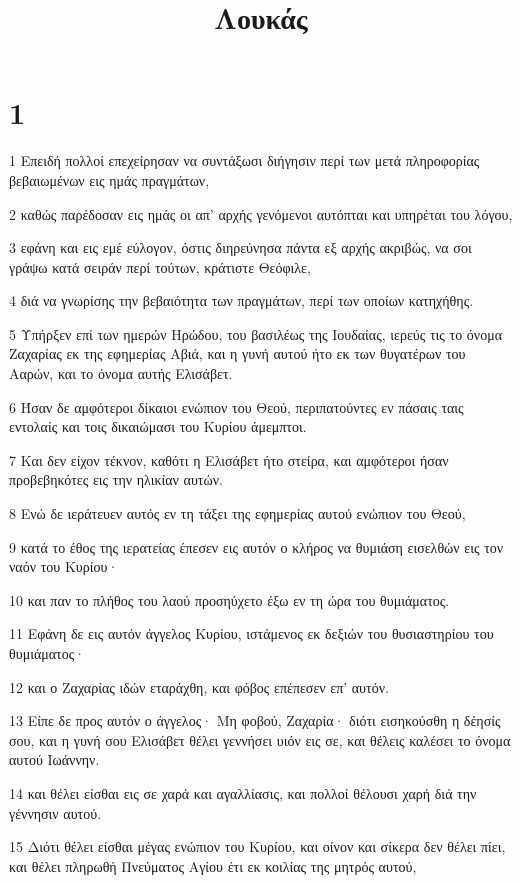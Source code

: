 

\title{Λουκάς}


\chapter{1}

\par 1 Επειδή πολλοί επεχείρησαν να συντάξωσι διήγησιν περί των μετά πληροφορίας βεβαιωμένων εις ημάς πραγμάτων,
\par 2 καθώς παρέδοσαν εις ημάς οι απ' αρχής γενόμενοι αυτόπται και υπηρέται του λόγου,
\par 3 εφάνη και εις εμέ εύλογον, όστις διηρεύνησα πάντα εξ αρχής ακριβώς, να σοι γράψω κατά σειράν περί τούτων, κράτιστε Θεόφιλε,
\par 4 διά να γνωρίσης την βεβαιότητα των πραγμάτων, περί των οποίων κατηχήθης.
\par 5 Υπήρξεν επί των ημερών Ηρώδου, του βασιλέως της Ιουδαίας, ιερεύς τις το όνομα Ζαχαρίας εκ της εφημερίας Αβιά, και η γυνή αυτού ήτο εκ των θυγατέρων του Ααρών, και το όνομα αυτής Ελισάβετ.
\par 6 Ήσαν δε αμφότεροι δίκαιοι ενώπιον του Θεού, περιπατούντες εν πάσαις ταις εντολαίς και τοις δικαιώμασι του Κυρίου άμεμπτοι.
\par 7 Και δεν είχον τέκνον, καθότι η Ελισάβετ ήτο στείρα, και αμφότεροι ήσαν προβεβηκότες εις την ηλικίαν αυτών.
\par 8 Ενώ δε ιεράτευεν αυτός εν τη τάξει της εφημερίας αυτού ενώπιον του Θεού,
\par 9 κατά το έθος της ιερατείας έπεσεν εις αυτόν ο κλήρος να θυμιάση εισελθών εις τον ναόν του Κυρίου·
\par 10 και παν το πλήθος του λαού προσηύχετο έξω εν τη ώρα του θυμιάματος.
\par 11 Εφάνη δε εις αυτόν άγγελος Κυρίου, ιστάμενος εκ δεξιών του θυσιαστηρίου του θυμιάματος·
\par 12 και ο Ζαχαρίας ιδών εταράχθη, και φόβος επέπεσεν επ' αυτόν.
\par 13 Είπε δε προς αυτόν ο άγγελος· Μη φοβού, Ζαχαρία· διότι εισηκούσθη η δέησίς σου, και η γυνή σου Ελισάβετ θέλει γεννήσει υιόν εις σε, και θέλεις καλέσει το όνομα αυτού Ιωάννην.
\par 14 και θέλει είσθαι εις σε χαρά και αγαλλίασις, και πολλοί θέλουσι χαρή διά την γέννησιν αυτού.
\par 15 Διότι θέλει είσθαι μέγας ενώπιον του Κυρίου, και οίνον και σίκερα δεν θέλει πίει, και θέλει πληρωθή Πνεύματος Αγίου έτι εκ κοιλίας της μητρός αυτού,
